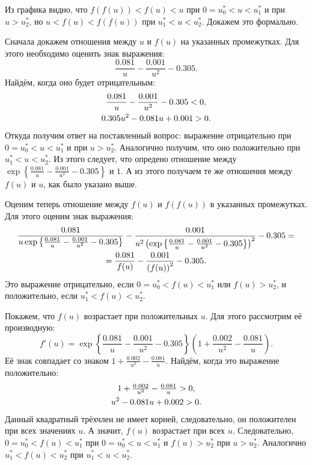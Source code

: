 \documentclass[11pt]{article}
\begin{document}
Из графика видно, что $f(f(u)) < f(u) < u$ при $0 = u_0^* < u < u_1^*$ и при $u > u_2^*$, но $u < f(u) < f(f(u))$ при $u_1^* < u < u_2^*$. Докажем это формально.

Сначала докажем отношения между $u$ и $f(u)$ на указанных промежутках. Для этого необходимо оценить знак выражения:
$$
\frac{0.081}{u} - \frac{0.001}{u^2} - 0.305.
$$
Найдём, когда оно будет отрицательным:
\begin{gather}
\frac{0.081}{u} - \frac{0.001}{u^2} - 0.305 < 0, \notag \\
0.305 u^2 - 0.081 u + 0.001 > 0. \notag
\end{gather}
Откуда получим ответ на поставленный вопрос: выражение отрицательно при $0 = u_0^* < u < u_1^*$ и при $u > u_2^*$. Аналогично получим, что оно положительно при $u_1^* < u < u_2^*$.
Из этого следует, что опредено отношение между $\exp\left\{ \frac{0.081}{u} - \frac{0.001}{u^2} - 0.305 \right\}$ и $1$. А из этого получаем те же отношения между $f(u)$ и $u$, как было указано выше.

Оценим теперь отношение между $f(u)$ и $f(f(u))$ в указанных промежутках. Для этого оценим знак выражения:
\begin{gather}
\frac{0.081}{u \exp\left\{ \frac{0.081}{u} - \frac{0.001}{u^2} - 0.305 \right\}} - \frac{0.001}{u^2 \left(\exp\left\{ \frac{0.081}{u} - \frac{0.001}{u^2} - 0.305 \right\}\right)^2} - 0.305 = \notag \\
= \frac{0.081}{f(u)} - \frac{0.001}{\left( f(u) \right)^2} - 0.305. \notag
\end{gather}
Это выражение отрицательно, если $0 = u_0^* < f(u) < u_1^*$ или $f(u) > u_2^*$, и положительно, если $u_1^* < f(u) < u_2^*$.

Покажем, что $f(u)$ возрастает при положительных $u$. Для этого рассмотрим её производную:
$$
f'(u) = \exp\left\{ \frac{0.081}{u} - \frac{0.001}{u^2} - 0.305 \right\} \left( 1 + \frac{0.002}{u^2} - \frac{0.081}{u} \right).
$$
Её знак совпадает со знаком $1 + \tfrac{0.002}{u^2} - \tfrac{0.081}{u}$. Найдём, когда это выражение положительно:
\begin{gather}
1 + \tfrac{0.002}{u^2} - \tfrac{0.081}{u} > 0, \notag \\
u^2 - 0.081 u + 0.002 > 0. \notag
\end{gather}
Данный квадратный трёхчлен не имеет корней, следовательно, он положителен при всех значениях $u$. А значит, $f(u)$ возрастает при всех $u$. Следовательно, $0 = u_0^* < f(u) < u_1^*$ при $0 = u_0^* < u < u_1^*$ и $f(u) > u_2^*$ при $u > u_2^*$. Аналогично $u_1^* < f(u) < u_2^*$ при $u_1^* < u < u_2^*$.
\end{document}
